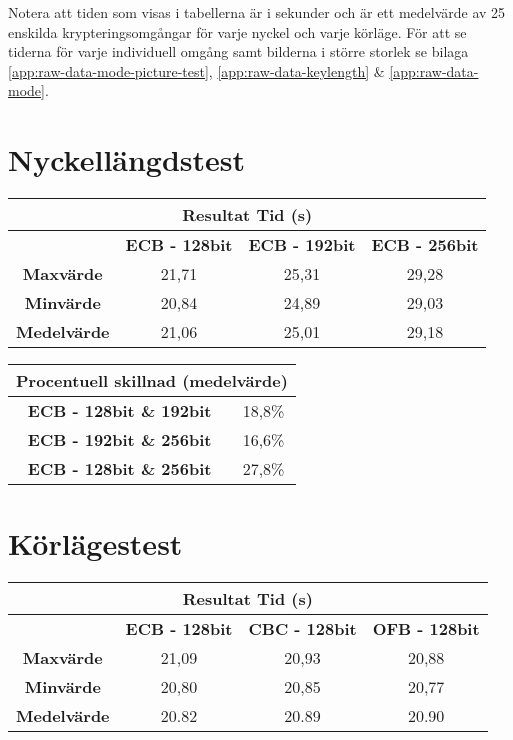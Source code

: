 \label{chap:resultat}
Notera att tiden som visas i tabellerna är i sekunder och är ett medelvärde av 25 enskilda
krypteringsomgångar för varje nyckel och varje körläge.
För att se tiderna för varje individuell omgång samt bilderna i större storlek
se bilaga \ref{app:raw-data-mode-picture-test}, \ref{app:raw-data-keylength} \& \ref{app:raw-data-mode}.

\section{Nyckellängdstest}
\label{sec:nyckellangd}

\begin{table}[H]
    \centering
    \begin{tabular}{ |c|c|c|c| }
      \multicolumn{4}{c}{\bfseries{Resultat Tid (s)}} \\
      \hline
      & \bfseries{ECB - 128bit} & \bfseries{ECB - 192bit} & \bfseries{ECB - 256bit} \\
      \hline
      \bfseries{Maxvärde} & 21,71 & 25,31 & 29,28 \\
      \hline
      \bfseries{Minvärde} & 20,84 & 24,89 & 29,03 \\
      \hline
      \bfseries{Medelvärde} & 21,06 & 25,01 & 29,18 \\
      \hline
    \end{tabular}
\end{table}

\begin{table}[H]
  \centering
  \begin{tabular}{ |c|c| }
    \multicolumn{2}{c}{\bfseries{Procentuell skillnad (medelvärde)}} \\
    \hline
    \bfseries{ECB - 128bit \& 192bit} & 18,8\% \\
    \hline
    \bfseries{ECB - 192bit \& 256bit} & 16,6\% \\
    \hline
    \bfseries{ECB - 128bit \& 256bit} & 27,8\% \\
    \hline
  \end{tabular}
\end{table}

\section{Körlägestest}
\label{sec:korlages}

\begin{table}[H]
    \centering
    \begin{tabular}{ |c|c|c|c| }
      \multicolumn{4}{c}{\bfseries{Resultat Tid (s)}} \\
      \hline
      & \bfseries{ECB - 128bit} & \bfseries{CBC - 128bit} & \bfseries{OFB - 128bit} \\
      \hline
      \bfseries{Maxvärde} & 21,09 & 20,93 & 20,88 \\
      \hline
      \bfseries{Minvärde} & 20,80 & 20,85 & 20,77 \\
      \hline
      \bfseries{Medelvärde} & 20.82 & 20.89 & 20.90 \\
      \hline
    \end{tabular}
\end{table}

